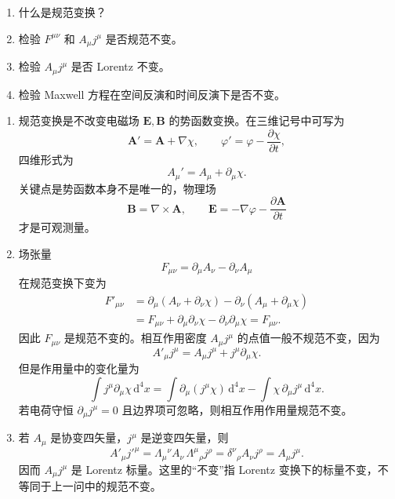 

\begin{question}
\begin{enumerate}
  \item 什么是规范变换？
  \item 检验 $F^{\mu\nu}$ 和 $A_\mu j^\mu$ 是否规范不变。
  \item 检验 $A_\mu j^\mu$ 是否 Lorentz 不变。
  \item 检验 Maxwell 方程在空间反演和时间反演下是否不变。
\end{enumerate}
\begin{solution}
\begin{enumerate}
  \item 规范变换是不改变电磁场 $\mathbf E,\mathbf B$ 的势函数变换。在三维记号中可写为
  \[
    \mathbf A' = \mathbf A + \nabla \chi,\qquad
    \varphi' = \varphi - \frac{\partial \chi}{\partial t},
  \]
  四维形式为
  \[
    A_\mu' = A_\mu + \partial_\mu \chi .
  \]
  关键点是势函数本身不是唯一的，物理场
  \[
    \mathbf B = \nabla \times \mathbf A,
    \qquad
    \mathbf E = -\nabla \varphi - \frac{\partial \mathbf A}{\partial t}
  \]
  才是可观测量。

  \item 场张量
  \[
    F_{\mu\nu}=\partial_\mu A_\nu-\partial_\nu A_\mu
  \]
  在规范变换下变为
  \[
  \begin{aligned}
    F'_{\mu\nu}
    &= \partial_\mu(A_\nu+\partial_\nu\chi)-\partial_\nu(A_\mu+\partial_\mu\chi) \\
    &= F_{\mu\nu}+\partial_\mu\partial_\nu\chi-\partial_\nu\partial_\mu\chi
     =F_{\mu\nu} .
  \end{aligned}
  \]
  因此 $F_{\mu\nu}$ 是规范不变的。相互作用密度 $A_\mu j^\mu$ 的点值一般不规范不变，因为
  \[
    A'_\mu j^\mu=A_\mu j^\mu+j^\mu\partial_\mu\chi .
  \]
  但是作用量中的变化量为
  \[
    \int j^\mu\partial_\mu\chi\,\mathrm d^4x
    =\int \partial_\mu(j^\mu\chi)\,\mathrm d^4x
     -\int \chi\,\partial_\mu j^\mu\,\mathrm d^4x .
  \]
  若电荷守恒 $\partial_\mu j^\mu=0$ 且边界项可忽略，则相互作用作用量规范不变。

  \item 若 $A_\mu$ 是协变四矢量，$j^\mu$ 是逆变四矢量，则
  \[
    A'_\mu j'^{\mu}
    =\Lambda_\mu{}^\nu A_\nu\,\Lambda^\mu{}_{\rho}j^\rho
    =\delta^\nu{}_{\rho}A_\nu j^\rho
    =A_\mu j^\mu .
  \]
  因而 $A_\mu j^\mu$ 是 Lorentz 标量。这里的“不变”指 Lorentz 变换下的标量不变，不等同于上一问中的规范不变。


\end{enumerate}
\end{solution}
\end{question}
